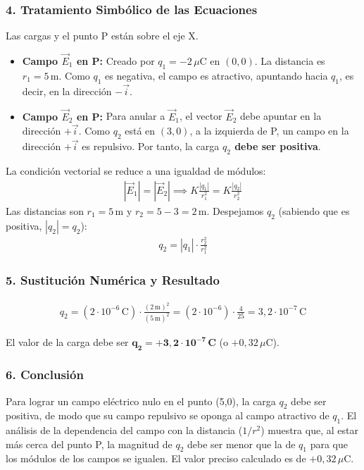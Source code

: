 \subsubsection*{4. Tratamiento Simbólico de las Ecuaciones}
Las cargas y el punto P están sobre el eje X.
\begin{itemize}
    \item \textbf{Campo $\vec{E}_1$ en P:} Creado por $q_1 = -2\,\mu\text{C}$ en $(0,0)$. La distancia es $r_1 = 5\,\text{m}$. Como $q_1$ es negativa, el campo es atractivo, apuntando hacia $q_1$, es decir, en la dirección $-\vec{i}$.
    \item \textbf{Campo $\vec{E}_2$ en P:} Para anular a $\vec{E}_1$, el vector $\vec{E}_2$ debe apuntar en la dirección $+\vec{i}$. Como $q_2$ está en $(3,0)$, a la izquierda de P, un campo en la dirección $+\vec{i}$ es repulsivo. Por tanto, la carga \textbf{$q_2$ debe ser positiva}.
\end{itemize}
La condición vectorial se reduce a una igualdad de módulos:
\begin{gather}
    |\vec{E}_1| = |\vec{E}_2| \implies K\frac{|q_1|}{r_1^2} = K\frac{|q_2|}{r_2^2}
\end{gather}
Las distancias son $r_1 = 5\,\text{m}$ y $r_2 = 5-3 = 2\,\text{m}$.
Despejamos $q_2$ (sabiendo que es positiva, $|q_2|=q_2$):
\begin{gather}
    q_2 = |q_1| \cdot \frac{r_2^2}{r_1^2}
\end{gather}

\subsubsection*{5. Sustitución Numérica y Resultado}
\begin{gather}
    q_2 = (2 \cdot 10^{-6}\,\text{C}) \cdot \frac{(2\,\text{m})^2}{(5\,\text{m})^2} = (2 \cdot 10^{-6}) \cdot \frac{4}{25} = 3,2 \cdot 10^{-7}\,\text{C}
\end{gather}
\begin{cajaresultado}
    El valor de la carga debe ser $\boldsymbol{q_2 = +3,2 \cdot 10^{-7}\,\textbf{C}}$ (o $+0,32\,\mu\text{C}$).
\end{cajaresultado}

\subsubsection*{6. Conclusión}
\begin{cajaconclusion}
Para lograr un campo eléctrico nulo en el punto (5,0), la carga $q_2$ debe ser positiva, de modo que su campo repulsivo se oponga al campo atractivo de $q_1$. El análisis de la dependencia del campo con la distancia ($1/r^2$) muestra que, al estar más cerca del punto P, la magnitud de $q_2$ debe ser menor que la de $q_1$ para que los módulos de los campos se igualen. El valor preciso calculado es de $+0,32\,\mu\text{C}$.
\end{cajaconclusion}


